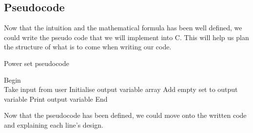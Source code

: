 \documentclass[a4paper]{article}
\theoremstyle{plain}
\theoremstyle{definition}
\theoremstyle{remark}
\begin{document}
\subsection{Pseudocode}
Now that the intuition and the mathematical formula has been well defined, we could write the pseudo code that we will implement into C. This will help us plan the structure of what is to come when writing our code.\\

\begin{algorithm}[H]
	\caption{Power set pseudocode}

	Begin \\
	Take input from user\;
	Initialise output variable array\;
	Add empty set to output variable\;
	Print output variable\;
	End
\end{algorithm}

\begin{flushleft}
Now that the pseudocode has been defined, we could move onto the written code and explaining each line's design.
\end{flushleft}
\end{document}

